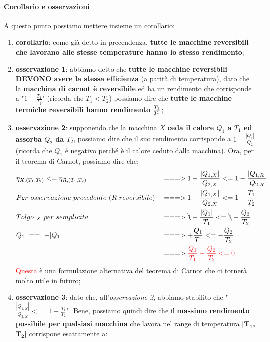             \paragraph{Corollario e osservazioni}
                A questo punto possiamo mettere insieme un corollario:
                \begin{enumerate}
                    \item \textbf{corollario}: come già detto in precendenza, \textbf{tutte le macchine reversibili che lavorano alle stesse temperature hanno lo stesso rendimento};
                    \item \textbf{osservazione 1}: abbiamo detto che \textbf{tutte le macchine reversibili DEVONO avere la stessa efficienza} (a parità di temperatura), dato che la \textbf{macchina di carnot è reversibile} ed ha un rendimento che corrisponde a "$1-\frac{T_1}{T_2}$" (ricorda che $T_1<T_2$) possiamo dire che \textbf{tutte le macchine termiche reversibili hanno rendimento \textcolor{Red}{$\-\frac{T_1}{T_2}$}};
                    \item \textbf{osservazione 2}: supponendo che la macchina $X$ \textbf{ceda il calore $Q_1$ a $T_1$ ed assorba $Q_2$ da $T_2$}, possiamo dire che il suo rendimento corrisponde a $1-\frac{|Q_1|}{Q_2}$ (ricorda che $Q_1$ è negativo perché è il calore ceduto dalla macchina). Ora, per il teorema di Carnot, possiamo dire che:
                    \begin{align*}
                        &\eta_{X, (T_1, T_2)} <= \eta_{R, (T_1, T_2)}&&===>1-\frac{|Q_{1, X}|}{Q_{2, X}} <= 1-\frac{|Q_{1, R}|}{Q_{2, R}}\\
                        & Per\ osservazione\ precedente\ (R\ reversibile) &&===>1-\frac{|Q_{1, X}|}{Q_{2, X}} <= 1-\frac{T_1}{T_2}\\
                        & Tolgo\ _X\ per\ semplicita && ===>\bcancel{1}-\frac{|Q_1|}{T_1} <= \bcancel{1}-\frac{Q_2}{T_2}\\
                        & Q_1\ ==\ -|Q_1|&& ===>+\frac{Q_1}{T_1} <= -\frac{Q_2}{T_2}\\
                        & && ===>\textcolor{Red}{\frac{Q_1}{T_1}+ \frac{Q_2}{T_2} <= 0}\\
                    \end{align*}
                    \textcolor{Red}{Questa} è una formulazione alternativa del teorema di Carnot che ci tornerà molto utile in futuro;
                    \item \textbf{osservazione 3}: dato che, all'\textit{osservazione 2}, abbiamo stabilito che "$\frac{|Q_{1, X}|}{Q_{2, X}} <= 1-\frac{T_1}{T_2}$". Bene, possiamo quindi dire che il \textbf{massimo rendimento possibile per qualsiasi macchina} che lavora nel range di temperatura \textbf{[$\mathbf{T_1}$, $\mathbf{T_2}$]} corrispone esattamente a:

\end{enumerate}

